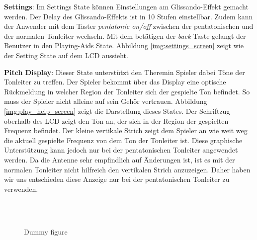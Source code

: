 \textbf{Settings}:
Im Settings State können Einstellungen am Glissando-Effekt gemacht werden. Der Delay des Glissando-Effekts ist in 10 Stufen einstellbar. Zudem kann der Anwender mit dem Taster \textit{pentatonic on/off} zwischen der pentatonischen und der normalen Tonleiter wechseln. Mit dem betätigen der \textit{back} Taste gelangt der Benutzer in den Playing-Aids State. Abbildung \ref{img:settings_screen} zeigt wie der Setting State auf dem LCD aussieht.

\textbf{Pitch Display}:
Dieser State unterstützt den Theremin Spieler dabei Töne der Tonleiter zu treffen. Der Spieler bekommt über das Display eine optische Rückmeldung in welcher Region der Tonleiter sich der gespielte Ton befindet. So muss der Spieler nicht alleine auf sein Gehör vertrauen.
Abbildung \ref{img:play_help_screen} zeigt die Darstellung dieses States.  
Der Schriftzug oberhalb des LCD zeigt den Ton an, der sich in der Region der gespielten Frequenz befindet. 
Der kleine vertikale Strich zeigt dem Spieler an wie weit weg die aktuell gespielte Frequenz von dem Ton der Tonleiter ist. 
Diese graphische Unterstützung kann jedoch nur bei der pentatonischen Tonleiter angewendet werden. Da die Antenne sehr empfindlich auf Änderungen ist, ist es mit der normalen Tonleiter nicht hilfreich den vertikalen Strich anzuzeigen. Daher haben wir uns entschieden diese Anzeige nur bei der pentatonischen Tonleiter zu verwenden.

\begin{figure}[!ht]
	\hfill
	\hfill
	\\
	\hfill
	\hfill
	\\
	\hfill

	\caption{Dummy figure}
	\label{fig:dummy}
\end{figure}
